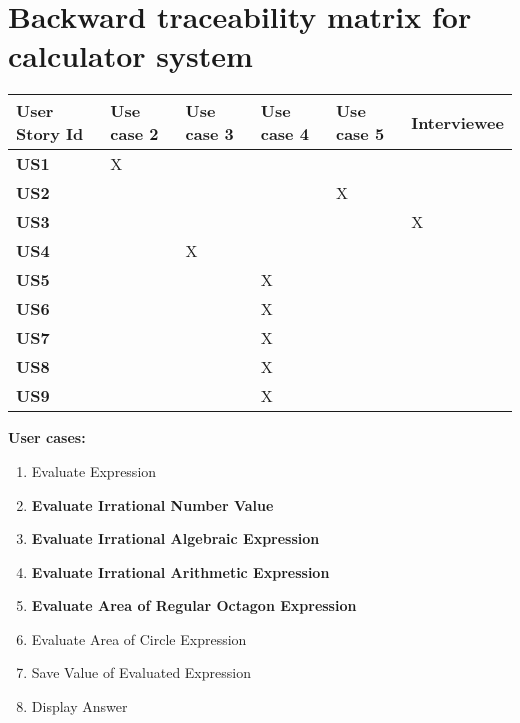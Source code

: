 \section{Backward traceability matrix for calculator system}
\begin{center}
\begin{tabu} to 1.0\textwidth { | X[c] | X[c] | X[c] | X[c] | X[c] | X[c] | }

\hline
\textbf{User Story Id} & Use case 2 & Use case 3 & Use case 4 & Use case 5 & Interviewee\\[1.5ex]

\hline
\textbf{US1} & X &  &  &  & \\

\hline
\textbf{US2} &  &  &  & X & \\ 

\hline
\textbf{US3} &  &  &  &  & X\\ 

\hline
\textbf{US4} &  & X &  &  & \\ 

\hline
\textbf{US5} &  &  & X &  & \\ 

\hline
\textbf{US6} &  &  & X &  & \\ 

\hline
\textbf{US7} &  &  & X &  & \\ 

\hline
\textbf{US8} &  &  & X &  & \\ 

\hline
\textbf{US9} &  &  & X &  & \\ 

\hline

\end{tabu}
\end{center}
\vspace{1cm}
\textbf{User cases: }
\begin{enumerate}
  \item Evaluate Expression
  \item \textbf{Evaluate Irrational Number Value}
  \item \textbf{Evaluate Irrational Algebraic Expression}
  \item \textbf{Evaluate Irrational Arithmetic Expression}
  \item \textbf{Evaluate Area of Regular Octagon Expression}
  \item Evaluate Area of Circle Expression
  \item Save Value of Evaluated Expression
  \item Display Answer
\end{enumerate}